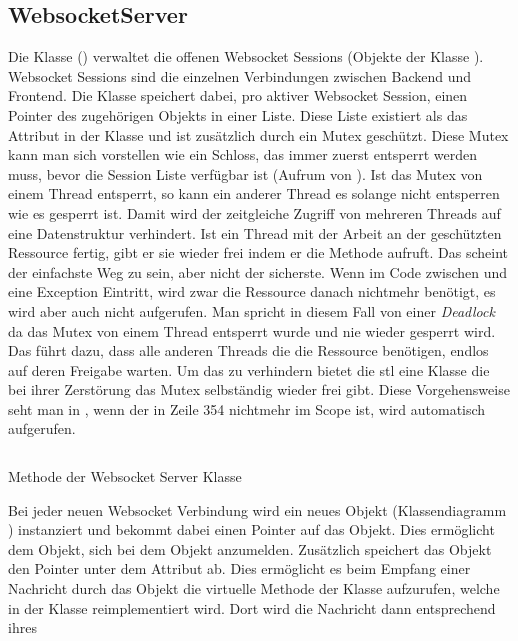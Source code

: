 \subsection{WebsocketServer}
Die Klasse  () verwaltet die offenen Websocket Sessions (Objekte der Klasse ). 
Websocket Sessions sind die einzelnen Verbindungen zwischen Backend und Frontend.
Die  Klasse speichert dabei, pro aktiver Websocket Session, einen Pointer des zugehörigen  Objekts in einer Liste.
Diese Liste existiert als das Attribut  in der Klasse  und ist zusätzlich durch ein Mutex geschützt.
Diese Mutex kann man sich vorstellen wie ein Schloss, das immer zuerst entsperrt werden muss, 
bevor die Session Liste verfügbar ist (Aufrum von ). 
Ist das Mutex von einem Thread entsperrt, so kann ein anderer Thread es solange nicht entsperren wie es gesperrt ist.
Damit wird der zeitgleiche Zugriff von mehreren Threads auf eine Datenstruktur verhindert.
Ist ein Thread mit der Arbeit an der geschützten Ressource fertig, gibt er sie wieder frei indem er die Methode  aufruft.
Das scheint der einfachste Weg zu sein, aber nicht der sicherste. 
Wenn im Code zwischen  und  eine Exception Eintritt, 
wird zwar die Ressource danach nichtmehr benötigt, es wird aber auch nicht  aufgerufen.
Man spricht in diesem Fall von einer \emph{Deadlock} da das Mutex von einem Thread entsperrt wurde und nie wieder gesperrt wird. 
Das führt dazu, dass alle anderen Threads die die Ressource benötigen, endlos auf deren Freigabe warten. 
Um das zu verhindern bietet die \ac{stl} eine  Klasse die bei ihrer Zerstörung das Mutex selbständig wieder frei gibt.
Diese Vorgehensweise seht man in , wenn der  in Zeile 354 nichtmehr im Scope ist, wird automatisch  aufgerufen.
\begin{listing}[ht]
  \inputminted[linenos=true,breaklines=true, firstline=348, lastline=354]{c++}{../Backend/WebsocketServer.cpp}
  \caption{Methode  der Websocket Server Klasse}
  \label{list:addSession}
\end{listing}
Bei jeder neuen Websocket Verbindung wird ein neues  Objekt (Klassendiagramm ) instanziert 
und bekommt dabei einen Pointer auf das  Objekt. Dies ermöglicht dem  Objekt, 
sich bei dem  Objekt anzumelden. 
Zusätzlich speichert das  Objekt den Pointer unter dem Attribut  ab.
Dies ermöglicht es beim Empfang einer Nachricht durch das  Objekt die virtuelle Methode  der  Klasse aufzurufen, welche in der  Klasse reimplementiert wird.
Dort wird die Nachricht dann entsprechend ihres


